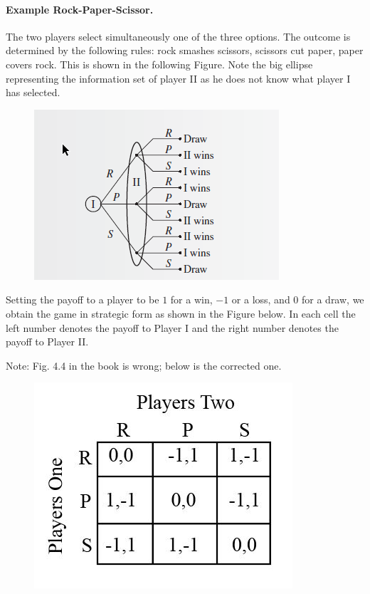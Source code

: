 \paragraph{Example Rock-Paper-Scissor.} The two players select simultaneously one of the three options. The outcome is determined by the following rules: rock smashes scissors, scissors cut paper, paper covers rock. This is shown in the following Figure. Note the big ellipse representing the information set of player II as he does not know what player I has selected.

\begin{figure}[H]
    \centering
    \includegraphics[scale=1]{images/2023-10-10-game_theory_05.png}
\end{figure}

Setting the payoff to a player to be $1$ for a win, $-1$ or a loss, and $0$ for a draw, we obtain the game in strategic form as shown in the Figure below. In each cell the left number denotes the payoff to Player I and the right number denotes the payoff to Player II.

Note: Fig. 4.4 in the book  is wrong; below is the corrected one.

\begin{figure}[H]
    \centering
    \includegraphics[scale=0.7]{images/2023-10-10-game_theory_06.png}
\end{figure}

